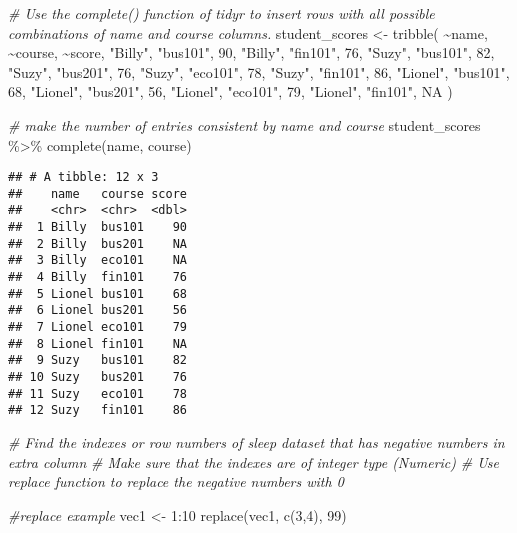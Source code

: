 \documentclass[
]{article}
\newenvironment{Shaded}{\begin{snugshade}}{\end{snugshade}}
\newcommand{\CommentTok}[1]{\textcolor[rgb]{0.56,0.35,0.01}{\textit{#1}}}
\newcommand{\ConstantTok}[1]{\textcolor[rgb]{0.00,0.00,0.00}{#1}}
\newcommand{\DecValTok}[1]{\textcolor[rgb]{0.00,0.00,0.81}{#1}}
\newcommand{\FunctionTok}[1]{\textcolor[rgb]{0.00,0.00,0.00}{#1}}
\newcommand{\NormalTok}[1]{#1}
\newcommand{\OtherTok}[1]{\textcolor[rgb]{0.56,0.35,0.01}{#1}}
\newcommand{\SpecialCharTok}[1]{\textcolor[rgb]{0.00,0.00,0.00}{#1}}
\newcommand{\StringTok}[1]{\textcolor[rgb]{0.31,0.60,0.02}{#1}}
\begin{document}
\begin{Shaded}
\begin{Highlighting}[]
\CommentTok{\# Use the complete() function of tidyr to insert rows with all possible combinations of name and course columns. }
\NormalTok{student\_scores }\OtherTok{\textless{}{-}} \FunctionTok{tribble}\NormalTok{( }
  \SpecialCharTok{\textasciitilde{}}\NormalTok{name, }\SpecialCharTok{\textasciitilde{}}\NormalTok{course, }\SpecialCharTok{\textasciitilde{}}\NormalTok{score, }
  \StringTok{"Billy"}\NormalTok{, }\StringTok{"bus101"}\NormalTok{, }\DecValTok{90}\NormalTok{,}
  \StringTok{"Billy"}\NormalTok{, }\StringTok{"fin101"}\NormalTok{, }\DecValTok{76}\NormalTok{,}
  \StringTok{"Suzy"}\NormalTok{, }\StringTok{"bus101"}\NormalTok{, }\DecValTok{82}\NormalTok{,}
  \StringTok{"Suzy"}\NormalTok{, }\StringTok{"bus201"}\NormalTok{, }\DecValTok{76}\NormalTok{,}
  \StringTok{"Suzy"}\NormalTok{, }\StringTok{"eco101"}\NormalTok{, }\DecValTok{78}\NormalTok{,}
  \StringTok{"Suzy"}\NormalTok{, }\StringTok{"fin101"}\NormalTok{, }\DecValTok{86}\NormalTok{,}
  \StringTok{"Lionel"}\NormalTok{, }\StringTok{"bus101"}\NormalTok{, }\DecValTok{68}\NormalTok{,}
  \StringTok{"Lionel"}\NormalTok{, }\StringTok{"bus201"}\NormalTok{, }\DecValTok{56}\NormalTok{,}
  \StringTok{"Lionel"}\NormalTok{, }\StringTok{"eco101"}\NormalTok{, }\DecValTok{79}\NormalTok{,}
  \StringTok{"Lionel"}\NormalTok{, }\StringTok{"fin101"}\NormalTok{, }\ConstantTok{NA}\NormalTok{ )}

\CommentTok{\# make the number of entries consistent by name and course}
\NormalTok{student\_scores }\SpecialCharTok{\%\textgreater{}\%}
\FunctionTok{complete}\NormalTok{(name, course)}
\end{Highlighting}
\end{Shaded}

\begin{verbatim}
## # A tibble: 12 x 3
##    name   course score
##    <chr>  <chr>  <dbl>
##  1 Billy  bus101    90
##  2 Billy  bus201    NA
##  3 Billy  eco101    NA
##  4 Billy  fin101    76
##  5 Lionel bus101    68
##  6 Lionel bus201    56
##  7 Lionel eco101    79
##  8 Lionel fin101    NA
##  9 Suzy   bus101    82
## 10 Suzy   bus201    76
## 11 Suzy   eco101    78
## 12 Suzy   fin101    86
\end{verbatim}

\begin{Shaded}
\begin{Highlighting}[]
\CommentTok{\# Find the indexes or row numbers of sleep dataset that has negative numbers in extra column }
\CommentTok{\# Make sure that the indexes are of integer type (Numeric)}
\CommentTok{\# Use replace function to replace the negative numbers with 0}

\CommentTok{\#replace example}
\NormalTok{vec1 }\OtherTok{\textless{}{-}} \DecValTok{1}\SpecialCharTok{:}\DecValTok{10}
\FunctionTok{replace}\NormalTok{(vec1, }\FunctionTok{c}\NormalTok{(}\DecValTok{3}\NormalTok{,}\DecValTok{4}\NormalTok{), }\DecValTok{99}\NormalTok{)}
\end{Highlighting}
\end{Shaded}
\end{document}
